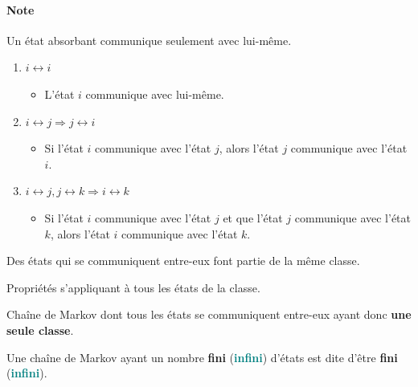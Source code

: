 \documentclass[10pt, french]{article}
\begin{document}
\begin{multicols*}{2}
\paragraph{Note}	Un état absorbant communique seulement avec lui-même.
 
\begin{definitionNOHFILLpropos}
\begin{enumerate}[label	=	\circled{\arabic*}{trueblue}]
	\item	$i \leftrightarrow i$
		\begin{itemize}
		\item	L'état $i$ communique avec lui-même.
		\end{itemize}
	\item	$i \leftrightarrow j \Rightarrow j \leftrightarrow i$
		\begin{itemize}
		\item	Si l'état $i$ communique avec l'état $j$, alors l'état $j$ communique avec l'état $i$.
		\end{itemize}
	\item	$i \leftrightarrow j, j \leftrightarrow k \Rightarrow i \leftrightarrow k$
		\begin{itemize}
		\item	Si l'état $i$ communique avec l'état $j$ et que l'état $j$ communique avec l'état $k$, alors l'état $i$ communique avec l'état $k$.
		\end{itemize}
\end{enumerate}
\end{definitionNOHFILLpropos}


\begin{definitionNOHFILL}
Des états qui se communiquent entre-eux font partie de la même classe.

\begin{definitionNOHFILLsub}
Propriétés s'appliquant à tous les états de la classe.
\end{definitionNOHFILLsub}
\end{definitionNOHFILL}


\begin{definitionNOHFILL}
Chaîne de Markov dont tous les états se communiquent entre-eux ayant donc \textbf{une seule classe}.
\end{definitionNOHFILL}

\begin{definitionNOHFILLprop}
Une chaîne de Markov ayant un nombre \textbf{fini} (\textcolor{teal}{\textbf{infini}}) d'états est dite d'être \textbf{fini} (\textcolor{teal}{\textbf{infini}}).
\end{definitionNOHFILLprop}



\end{multicols*}
\end{document}
